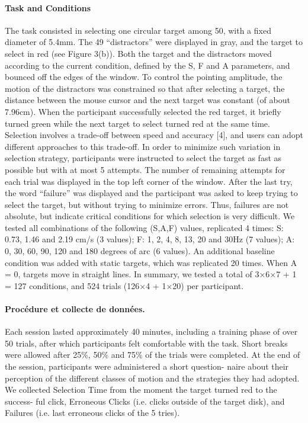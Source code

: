 \paragraph{Task and Conditions}
The task consisted in selecting one circular target among 50,
with a fixed diameter of 5.4mm. The 49 “distractors” were displayed in gray, and the
target to select in red (see Figure 3(b)). Both the target and the distractors moved
according to the current condition, defined by the S, F and A parameters, and bounced
off the edges of the window. To control the pointing amplitude, the motion of the
distractors was constrained so that after selecting a target, the distance between the
mouse cursor and the next target was constant (of about 7.96cm). When the participant successfully selected the red target, it briefly turned green while the next target to
select turned red at the same time.
Selection involves a trade-off between speed and accuracy [4], and users can adopt
different approaches to this trade-off. In order to minimize such variation in selection
strategy, participants were instructed to select the target as fast as possible but with at
most 5 attempts. The number of remaining attempts for each trial was displayed in the
top left corner of the window. After the last try, the word “failure” was displayed and
the participant was asked to keep trying to select the target, but without trying to
minimize errors. Thus, failures are not absolute, but indicate critical conditions for
which selection is very difficult.
We tested all combinations of the following (S,A,F) values, replicated 4 times:
 S: 0.73, 1.46 and 2.19 cm/s (3 values);
 F: 1, 2, 4, 8, 13, 20 and 30Hz (7 values);
 A: 0, 30, 60, 90, 120 and 180 degrees of arc (6 values).
An additional baseline condition was added with static targets, which was replicated 20 times. When A = 0, targets move in straight lines. In summary, we tested a total of 3×6×7 + 1 = 127 conditions, and 524 trials (126×4 + 1×20) per participant.

\paragraph{Procédure et collecte de données.}
Each session lasted approximately 40 minutes, including a training phase of over 50 trials, after which participants felt comfortable
with the task. Short breaks were allowed after 25\%{}, 50\%{} and 75\%{} of the trials were
completed. At the end of the session, participants were administered a short question-
naire about their perception of the different classes of motion and the strategies they
had adopted.
We collected Selection Time from the moment the target turned red to the success-
ful click, Erroneous Clicks (i.e. clicks outside of the target disk), and Failures (i.e.
last erroneous clicks of the 5 tries).

